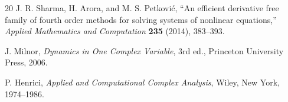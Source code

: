 \documentclass[10pt,a4paper]{article}
\theoremstyle{plain}
\theoremstyle{definition}
\theoremstyle{remark}
\begin{document}
\begin{thebibliography}{20}
J. R. Sharma, H. Arora, and M. S. Petkovi\'c,
``An efficient derivative free family of fourth order methods for solving systems of nonlinear equations,''
\textit{Applied Mathematics and Computation} \textbf{235} (2014), 383--393.

J. Milnor,
\textit{Dynamics in One Complex Variable},
3rd ed., Princeton University Press, 2006.

P. Henrici,
\textit{Applied and Computational Complex Analysis},
Wiley, New York, 1974--1986.

\end{thebibliography}
\end{document}
